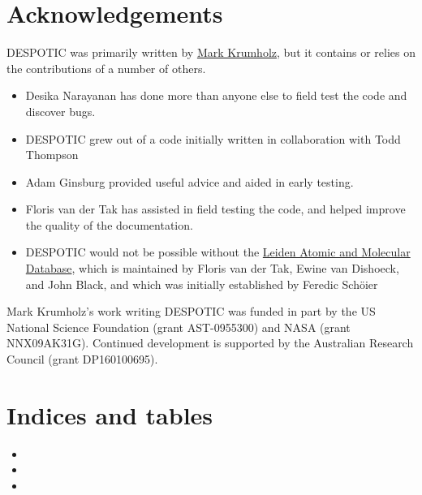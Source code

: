 \documentclass[letterpaper,10pt,english]{sphinxmanual}
\begin{document}
\chapter{Acknowledgements}
\label{acknowledgements:acknowledgements}\label{acknowledgements::doc}\label{acknowledgements:sec-acknowledgements}
DESPOTIC was primarily written by \href{http://www.mso.anu.edu.au/~krumholz/}{Mark Krumholz}, but it contains or relies on
the contributions of a number of others.
\begin{itemize}
\item {} 
Desika Narayanan has done more than anyone else to field test the
code and discover bugs.

\item {} 
DESPOTIC grew out of a code initially written in collaboration with
Todd Thompson

\item {} 
Adam Ginsburg provided useful advice and aided in early testing.

\item {} 
Floris van der Tak has assisted in field testing the code, and
helped improve the quality of the documentation.

\item {} 
DESPOTIC would not be possible without the \href{http://home.strw.leidenuniv.nl/~moldata/}{Leiden Atomic and
Molecular Database},
which is maintained by Floris van der Tak, Ewine van Dishoeck, and
John Black, and which was initially established by Feredic Schöier

\end{itemize}

Mark Krumholz's work writing DESPOTIC was funded in part by the US
National Science Foundation (grant AST-0955300) and NASA (grant
NNX09AK31G). Continued development is supported by the Australian
Research Council (grant DP160100695).


\chapter{Indices and tables}
\label{index:indices-and-tables}\begin{itemize}
\item {} 

\item {} 

\item {} 

\end{itemize}



\renewcommand{\indexname}{Index}
\printindex
\end{document}
